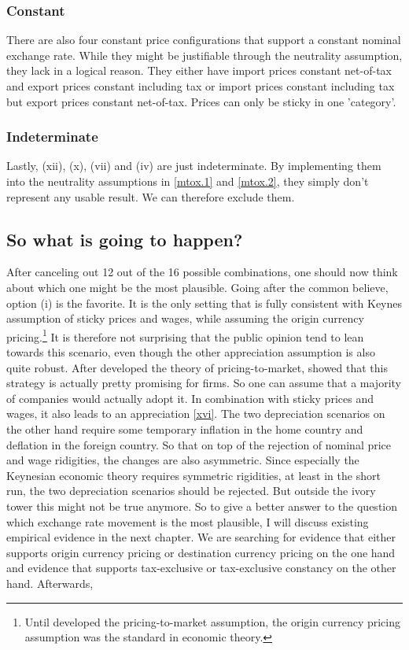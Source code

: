 \subsubsection{Constant}
There are also four constant price configurations that support a constant nominal exchange rate. While they might be justifiable through the neutrality assumption, they lack in a logical reason. They either have import prices constant net-of-tax and export prices constant including tax or import prices constant including tax but export prices constant net-of-tax. Prices can only be sticky in one 'category'. 

\subsubsection{Indeterminate }
Lastly, (xii), (x), (vii) and (iv) are just indeterminate. By implementing them into the neutrality assumptions in \eqref{mtox.1} and  \eqref{mtox.2}, they simply don't represent any usable result. We can therefore exclude them.

\subsection{So what is going to happen? }
After canceling out 12 out of the 16 possible combinations, one should now think about which one might be the most plausible. Going after the common believe, option (i) is the favorite. It is the only setting that is fully consistent with Keynes assumption of sticky prices and wages, while assuming the origin currency pricing.\footnote{Until \cite{krugman1986pricing} developed the pricing-to-market assumption, the origin currency pricing assumption was the standard in economic theory.} It is therefore not surprising that the public opinion tend to lean towards this scenario, even though the other appreciation assumption is also quite robust. After \cite{krugman1986pricing} developed the theory of pricing-to-market, \cite{fendel2008local} showed that this strategy is actually pretty promising for firms. So one can assume that a majority of companies would actually adopt it. In combination with sticky prices and wages, it also leads to an appreciation \eqref{xvi}.  
The two depreciation scenarios on the other hand require some temporary inflation in the home country and deflation in the foreign country. So that on top of the rejection of nominal price and wage ridigities, the changes are also asymmetric. Since especially the Keynesian economic theory requires symmetric rigidities, at least in the short run, the two depreciation scenarios should be rejected. But outside the ivory tower this might not be true anymore. So to give a better answer to the question which exchange rate movement is the most plausible, I will discuss existing empirical evidence in the next chapter. We are searching for evidence that either supports origin currency pricing or destination currency pricing on the one hand and evidence that supports tax-exclusive or tax-exclusive constancy on the other hand. Afterwards, 

